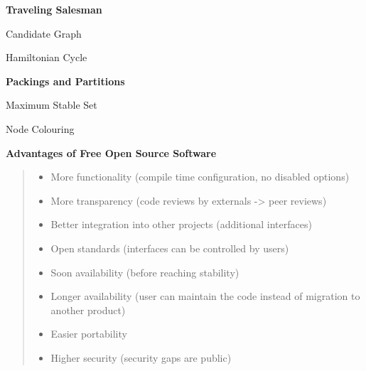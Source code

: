 \documentclass{report}
\begin{document}
\begin{landscape}
\clearpage
{\Huge\bf Traveling Salesman}

\vspace*{2cm}
\begin{minipage}{10cm}
\begin{center}
{\huge Candidate Graph}
\vspace*{1.5cm}

\epsfxsize=10cm
\end{center}
\end{minipage}
\hspace*{3cm}
\begin{minipage}{10cm}
\begin{center}
\epsfxsize=10cm

\vspace*{2cm}
{\huge Hamiltonian Cycle}
\end{center}
\end{minipage}


\clearpage
{\Huge\bf Packings and Partitions}

\vspace*{2cm}
\begin{minipage}{10cm}
\begin{center}
{\huge Maximum Stable Set}
\vspace*{1.5cm}

\epsfxsize=10cm
\end{center}
\end{minipage}
\hspace*{3cm}
\begin{minipage}{10cm}
\begin{center}
\epsfxsize=10cm

\vspace*{1.5cm}
{\huge Node Colouring}
\end{center}
\end{minipage}


\clearpage
{\Huge\bf Advantages of Free Open Source Software}
{\huge
\vspace*{1cm}
\begin{quote}
\begin{itemize}
\item More functionality (compile time configuration, no disabled options)
\item More transparency (code reviews by externals -> peer reviews)
\item Better integration into other projects (additional interfaces)
\item Open standards (interfaces can be controlled by users)
\item Soon availability (before reaching stability)
\item Longer availability (user can maintain the code instead of migration to
        another product)
\item Easier portability
\item Higher security (security gaps are public)
\end{itemize}
\end{quote}}



\end{landscape}
\end{document}
